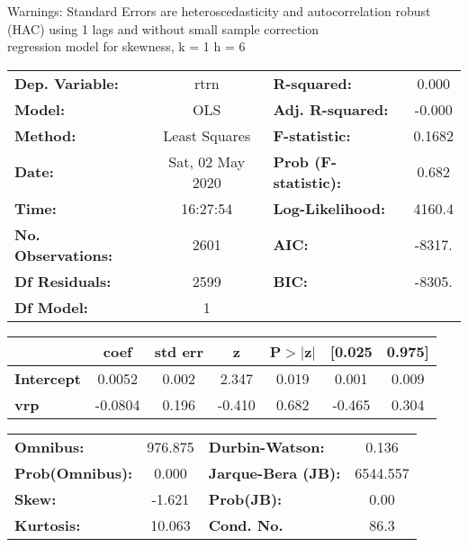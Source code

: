 Warnings: \newline
 [1] Standard Errors are heteroscedasticity and autocorrelation robust (HAC) using 1 lags and without small sample correction\\ 

regression model for skewness, k = 1 h = 6\begin{center}
\begin{tabular}{lclc}
\toprule
\textbf{Dep. Variable:}    &       rtrn       & \textbf{  R-squared:         } &     0.000   \\
\textbf{Model:}            &       OLS        & \textbf{  Adj. R-squared:    } &    -0.000   \\
\textbf{Method:}           &  Least Squares   & \textbf{  F-statistic:       } &    0.1682   \\
\textbf{Date:}             & Sat, 02 May 2020 & \textbf{  Prob (F-statistic):} &    0.682    \\
\textbf{Time:}             &     16:27:54     & \textbf{  Log-Likelihood:    } &    4160.4   \\
\textbf{No. Observations:} &        2601      & \textbf{  AIC:               } &    -8317.   \\
\textbf{Df Residuals:}     &        2599      & \textbf{  BIC:               } &    -8305.   \\
\textbf{Df Model:}         &           1      & \textbf{                     } &             \\
\bottomrule
\end{tabular}
\begin{tabular}{lcccccc}
                   & \textbf{coef} & \textbf{std err} & \textbf{z} & \textbf{P$> |$z$|$} & \textbf{[0.025} & \textbf{0.975]}  \\
\midrule
\textbf{Intercept} &       0.0052  &        0.002     &     2.347  &         0.019        &        0.001    &        0.009     \\
\textbf{vrp}       &      -0.0804  &        0.196     &    -0.410  &         0.682        &       -0.465    &        0.304     \\
\bottomrule
\end{tabular}
\begin{tabular}{lclc}
\textbf{Omnibus:}       & 976.875 & \textbf{  Durbin-Watson:     } &    0.136  \\
\textbf{Prob(Omnibus):} &   0.000 & \textbf{  Jarque-Bera (JB):  } & 6544.557  \\
\textbf{Skew:}          &  -1.621 & \textbf{  Prob(JB):          } &     0.00  \\
\textbf{Kurtosis:}      &  10.063 & \textbf{  Cond. No.          } &     86.3  \\
\bottomrule
\end{tabular}
\end{center}

